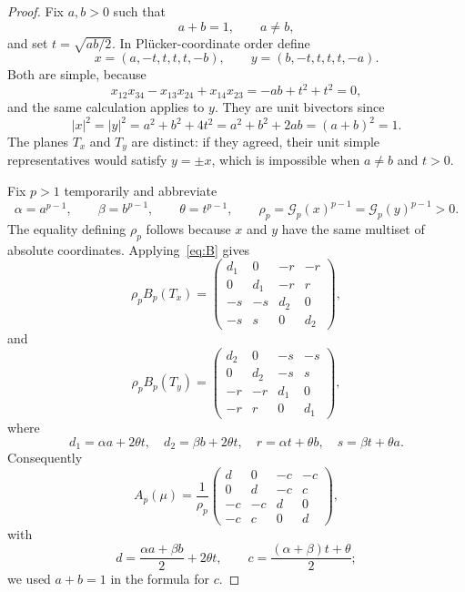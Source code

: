 \documentclass[11pt]{article}
\begin{document}
\begin{proof}
Fix $a,b>0$ such that
\[
 a+b=1,\qquad a\ne b,
\]
and set $t=\sqrt{ab/2}$.  In Pl\"ucker-coordinate order define
\begin{equation}\label{eq:xy}
 x=(a,-t,t,t,t,-b),\qquad
 y=(b,-t,t,t,t,-a).
\end{equation}
Both are simple, because
\[
 x_{12}x_{34}-x_{13}x_{24}+x_{14}x_{23}
 =-ab+t^2+t^2=0,
\]
and the same calculation applies to $y$.  They are unit bivectors since
\[
 |x|^2=|y|^2=a^2+b^2+4t^2=a^2+b^2+2ab=(a+b)^2=1.
\]
The planes $T_x$ and $T_y$ are distinct: if they agreed, their unit simple
representatives would satisfy $y=\pm x$, which is impossible when $a\ne b$
and $t>0$.

Fix $p>1$ temporarily and abbreviate
\[
 \alpha=a^{p-1},\qquad \beta=b^{p-1},\qquad
 \theta=t^{p-1},\qquad
 \rho_p=\mathcal G_p(x)^{p-1}=\mathcal G_p(y)^{p-1}>0.
\]
The equality defining $\rho_p$ follows because $x$ and $y$ have the same
multiset of absolute coordinates.  Applying~\eqref{eq:B} gives
\begin{equation}\label{eq:Bx}
 \rho_p B_p(T_x)=
 \begin{pmatrix}
 d_1&0&-r&-r\\
 0&d_1&-r&r\\
 -s&-s&d_2&0\\
 -s&s&0&d_2
 \end{pmatrix},
\end{equation}
and
\begin{equation}\label{eq:By}
 \rho_p B_p(T_y)=
 \begin{pmatrix}
 d_2&0&-s&-s\\
 0&d_2&-s&s\\
 -r&-r&d_1&0\\
 -r&r&0&d_1
 \end{pmatrix},
\end{equation}
where
\[
 d_1=\alpha a+2\theta t,\quad
 d_2=\beta b+2\theta t,\quad
 r=\alpha t+\theta b,\quad
 s=\beta t+\theta a.
\]
Consequently
\begin{equation}\label{eq:average}
 A_p(\mu)=\frac1{\rho_p}
 \begin{pmatrix}
 d&0&-c&-c\\
 0&d&-c&c\\
 -c&-c&d&0\\
 -c&c&0&d
 \end{pmatrix},
\end{equation}
with
\begin{equation}\label{eq:dc}
 d=\frac{\alpha a+\beta b}{2}+2\theta t,
 \qquad
 c=\frac{(\alpha+\beta)t+\theta}{2};
\end{equation}
we used $a+b=1$ in the formula for $c$.


\end{proof}
\end{document}
